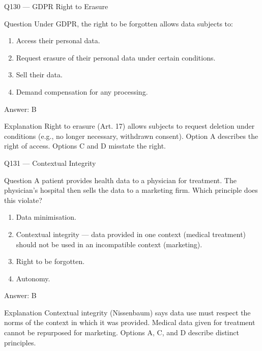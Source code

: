 \documentclass[aspectratio=169,8pt]{beamer}
\begin{document}
\begin{frame}{Q130 --- GDPR Right to Erasure}
\begin{block}{Question}
Under GDPR, the right to be forgotten allows data subjects to:
\begin{enumerate}
\item Access their personal data.
\item Request erasure of their personal data under certain conditions.
\item Sell their data.
\item Demand compensation for any processing.
\end{enumerate}
	\end{block}
\begin{exampleblock}{Answer: B}\end{exampleblock}
\begin{block}{Explanation}
Right to erasure (Art. 17) allows subjects to request deletion under conditions (e.g., no longer necessary, withdrawn consent). Option A describes the right of access. Options C and D misstate the right.
\end{block}
\end{frame}

\begin{frame}{Q131 --- Contextual Integrity}
\begin{block}{Question}
A patient provides health data to a physician for treatment. The physician's hospital then sells the data to a marketing firm. Which principle does this violate?
\begin{enumerate}
\item Data minimisation.
\item Contextual integrity --- data provided in one context (medical treatment) should not be used in an incompatible context (marketing).
\item Right to be forgotten.
\item Autonomy.
\end{enumerate}
	\end{block}
\begin{exampleblock}{Answer: B}\end{exampleblock}
\begin{block}{Explanation}
Contextual integrity (Nissenbaum) says data use must respect the norms of the context in which it was provided. Medical data given for treatment cannot be repurposed for marketing. Options A, C, and D describe distinct principles.
\end{block}
\end{frame}
\end{document}
